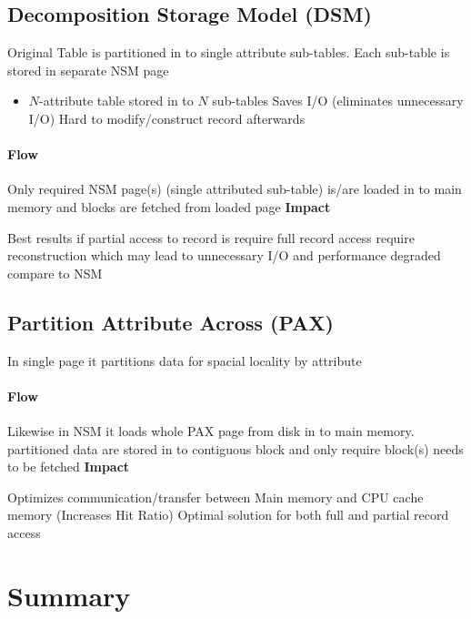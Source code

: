 \documentclass[paper=letter, fontsize=12pt]{article}
\begin{document}
\subsection{Decomposition Storage Model (DSM)}
	Original Table is partitioned in to single attribute sub-tables.
	Each sub-table is stored in separate NSM page
	\begin{itemize}
		\item $N$-attribute table stored in to $N$ sub-tables
		\tick Saves I/O (eliminates unnecessary I/O)
		\fail Hard to modify/construct record afterwards
	\end{itemize}
	
	\paragraph{Flow} 
	Only required NSM page(s) (single attributed sub-table) is/are loaded in to main memory and blocks are fetched from loaded page
	\textbf{Impact}
	\begin{itemize}
		\tick Best results if partial access to record is require
		\fail full record access require reconstruction which may lead to unnecessary I/O and performance degraded compare to NSM
	\end{itemize}

\subsection{Partition Attribute Across (PAX)}
	In single page it partitions data for spacial locality by attribute
	\paragraph{Flow} 
	Likewise in NSM it loads whole PAX page from disk in to main memory. partitioned data are stored in to contiguous block and only require block(s) needs to be fetched
	\textbf{Impact}
	\begin{itemize}
		\tick Optimizes communication/transfer between Main memory and CPU cache memory (Increases Hit Ratio)
		\tick Optimal solution for both full and partial record access
	\end{itemize}

\section{Summary}
\end{document}
